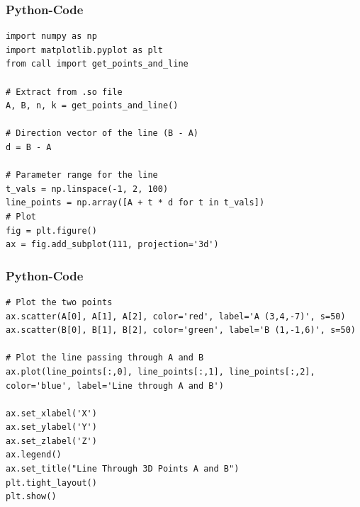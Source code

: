 \documentclass{beamer}
\begin{document}
\begin{frame}[fragile]
\frametitle{Python-Code}
\begin{lstlisting}
import numpy as np
import matplotlib.pyplot as plt
from call import get_points_and_line

# Extract from .so file
A, B, n, k = get_points_and_line()

# Direction vector of the line (B - A)
d = B - A

# Parameter range for the line
t_vals = np.linspace(-1, 2, 100)
line_points = np.array([A + t * d for t in t_vals])
# Plot
fig = plt.figure()
ax = fig.add_subplot(111, projection='3d')
\end{lstlisting}
\end{frame}

\begin{frame}[fragile]
\frametitle{Python-Code}
\begin{lstlisting}
# Plot the two points
ax.scatter(A[0], A[1], A[2], color='red', label='A (3,4,-7)', s=50)
ax.scatter(B[0], B[1], B[2], color='green', label='B (1,-1,6)', s=50)

# Plot the line passing through A and B
ax.plot(line_points[:,0], line_points[:,1], line_points[:,2], color='blue', label='Line through A and B')

ax.set_xlabel('X')
ax.set_ylabel('Y')
ax.set_zlabel('Z')
ax.legend()
ax.set_title("Line Through 3D Points A and B")
plt.tight_layout()
plt.show()
\end{lstlisting}
\end{frame}
\end{document}
